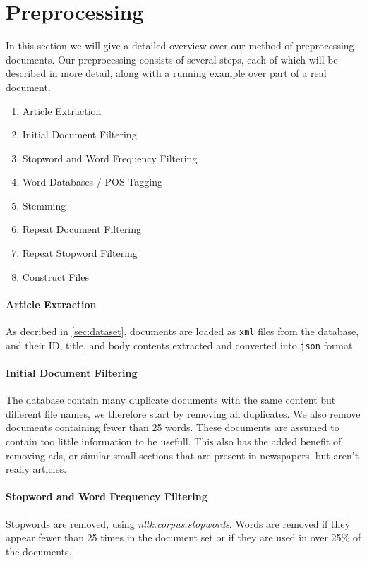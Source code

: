 \section{Preprocessing}\label{sec:prepro}

In this section we will give a detailed overview over our method of preprocessing documents.
Our preprocessing consists of several steps, each of which will be described in more detail, along with a running example over part of a real document.
\begin{enumerate}[label=\alph*]
	\item Article Extraction
	\item Initial Document Filtering
	\item Stopword and Word Frequency Filtering
	\item Word Databases / POS Tagging
	\item Stemming
	\item Repeat Document Filtering
	\item Repeat Stopword Filtering
	\item Construct Files
\end{enumerate}

\paragraph{Article Extraction}
As decribed in \autoref{sec:dataset}, documents are loaded as \texttt{xml} files from the database, and their ID, title, and body contents extracted and converted into \texttt{json} format.

\paragraph{Initial Document Filtering}
The database contain many duplicate documents with the same content but different file names, we therefore start by removing all duplicates.
We also remove documents containing fewer than 25 words. These documents are assumed to contain too little information to be usefull. This also has the added benefit of removing ads, or similar small sections that are present in newspapers, but aren't really articles.

\paragraph{Stopword and Word Frequency Filtering}
Stopwords are removed, using \emph{nltk.corpus.stopwords}.
Words are removed if they appear fewer than 25 times in the document set or if they are used in over 25\% of the documents.

